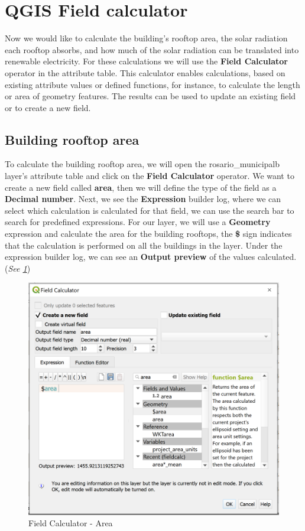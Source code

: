 \documentclass[
]{book}
\begin{document}
\hypertarget{qgis-field-calculator}{%
\section{QGIS Field calculator}\label{qgis-field-calculator}}

Now we would like to calculate the building's rooftop area, the solar radiation each rooftop absorbs, and how much of the solar radiation can be translated into renewable electricity.
For these calculations we will use the \textbf{Field Calculator} operator in the attribute table.
This calculator enables calculations, based on existing attribute values or defined functions, for instance, to calculate the length or area of geometry features. The results can be used to update an existing field or to create a new field.

\hypertarget{building-rooftop-area}{%
\subsection{Building rooftop area}\label{building-rooftop-area}}

To calculate the building rooftop area, we will open the {rosario\_municipalb} layer's attribute table and click on the \textbf{Field Calculator} operator. We want to create a new field called \textbf{area}, then we will define the type of the field as a \textbf{Decimal number}. Next, we see the \textbf{Expression} builder log, where we can select which calculation is calculated for that field, we can use the search bar to search for predefined expressions. For our layer, we will use a \textbf{Geometry} expression and calculate the area for the building rooftops, the \textbf{\$} sign indicates that the calculation is performed on all the buildings in the layer. Under the expression builder log, we can see an \textbf{Output preview} of the values calculated. (\emph{See \ref{fig:img-19}})

\begin{figure}

{\centering \includegraphics[width=0.7\linewidth]{images/fieldc} 

}

\caption{Field Calculator - Area}\label{fig:img-19}
\end{figure}
\end{document}
